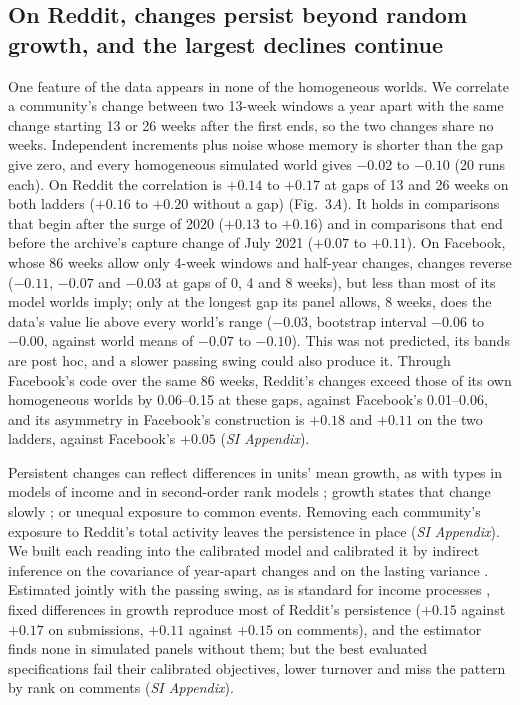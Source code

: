 \documentclass[9pt,twocolumn,twoside]{pnas-new}
\begin{document}
\subsection*{On Reddit, changes persist beyond random growth, and the largest declines continue}
One feature of the data appears in none of the homogeneous worlds. We correlate a community's change between two 13-week windows a year apart with the same change starting 13 or 26 weeks after the first ends, so the two changes share no weeks. Independent increments plus noise whose memory is shorter than the gap give zero, and every homogeneous simulated world gives $-0.02$ to $-0.10$ (20 runs each). On Reddit the correlation is $+0.14$ to $+0.17$ at gaps of 13 and 26 weeks on both ladders ($+0.16$ to $+0.20$ without a gap) (Fig.~3\textit{A}). It holds in comparisons that begin after the surge of 2020 ($+0.13$ to $+0.16$) and in comparisons that end before the archive's capture change of July 2021 ($+0.07$ to $+0.11$). On Facebook, whose 86 weeks allow only 4-week windows and half-year changes, changes reverse ($-0.11$, $-0.07$ and $-0.03$ at gaps of 0, 4 and 8 weeks), but less than most of its model worlds imply; only at the longest gap its panel allows, 8 weeks, does the data's value lie above every world's range ($-0.03$, bootstrap interval $-0.06$ to $-0.00$, against world means of $-0.07$ to $-0.10$). This was not predicted, its bands are post hoc, and a slower passing swing could also produce it. Through Facebook's code over the same 86 weeks, Reddit's changes exceed those of its own homogeneous worlds by 0.06--0.15 at these gaps, against Facebook's 0.01--0.06, and its asymmetry in Facebook's construction is $+0.18$ and $+0.11$ on the two ladders, against Facebook's $+0.05$ (\textit{SI Appendix}).

Persistent changes can reflect differences in units' mean growth, as with types in models of income and in second-order rank models \cite{guvenen2009,guvenen2021,fik2013}; growth states that change slowly \cite{mallmin2026}; or unequal exposure to common events. Removing each community's exposure to Reddit's total activity leaves the persistence in place (\textit{SI Appendix}). We built each reading into the calibrated model and calibrated it by indirect inference on the covariance of year-apart changes and on the lasting variance \cite{gourieroux1993,guvenen2014}. Estimated jointly with the passing swing, as is standard for income processes \cite{hryshko2012}, fixed differences in growth reproduce most of Reddit's persistence ($+0.15$ against $+0.17$ on submissions, $+0.11$ against $+0.15$ on comments), and the estimator finds none in simulated panels without them; but the best evaluated specifications fail their calibrated objectives, lower turnover and miss the pattern by rank on comments (\textit{SI Appendix}).
\end{document}
